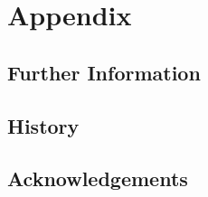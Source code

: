 \documentclass[10pt]{report}
\begin{document}
%


\part{Appendix}
\appendix

%

\chapter{Further Information}
  

\chapter{History}
  

\chapter {Acknowledgements}
  


\end{document}
